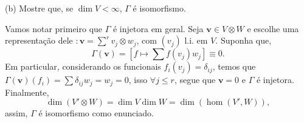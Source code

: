 (b) Mostre que, se \(\dim V < \infty\), \(\Gamma \) é isomorfismo. 

\textcolor{gris}{Vamos notar primeiro que \(\Gamma \) é injetora em geral. Seja \(\textbf{v}\in V\otimes W\) e escolhe uma representação dele \(: \textbf{v} = \sum^r v_j\otimes w_j \), com \((v_j)\) l.i. em \(V\). Suponha que, 
\[\Gamma(\textbf{v}) = \left[f \mapsto \sum f(v_j)w_j\right] \equiv 0.\]
Em particular, considerando os funcionais \(f_i(v_j) = \delta_{ij}\), temos que \(\Gamma(\textbf{v})(f_i) = \sum \delta_{ij}w_j = w_j = 0\), isso \(\forall j \leq r\), segue que \(\textbf{v}= 0\) e \(\Gamma \) é injetora. Finalmente,  
\[\dim( V' \otimes W) = \dim V \dim W = \dim (\hom(V', W)), \]
assim, \(\Gamma \) é isomorfismo como enunciado. 
}